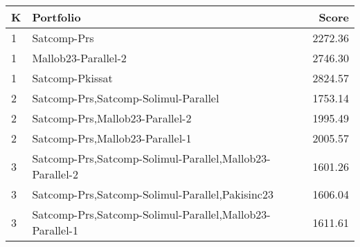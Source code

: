 \begin{tabular}{l|p{.9\linewidth}|r}
\toprule
K & Portfolio & Score \\
\midrule
1 & Satcomp-Prs & 2272.36 \\
1 & Mallob23-Parallel-2 & 2746.30 \\
1 & Satcomp-Pkissat & 2824.57 \\
2 & Satcomp-Prs,Satcomp-Solimul-Parallel & 1753.14 \\
2 & Satcomp-Prs,Mallob23-Parallel-2 & 1995.49 \\
2 & Satcomp-Prs,Mallob23-Parallel-1 & 2005.57 \\
3 & Satcomp-Prs,Satcomp-Solimul-Parallel,Mallob23-Parallel-2 & 1601.26 \\
3 & Satcomp-Prs,Satcomp-Solimul-Parallel,Pakisinc23 & 1606.04 \\
3 & Satcomp-Prs,Satcomp-Solimul-Parallel,Mallob23-Parallel-1 & 1611.61 \\
\bottomrule
\end{tabular}
